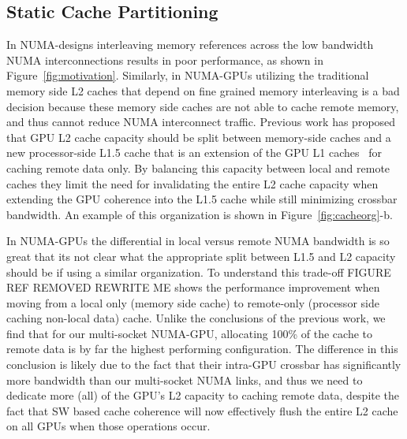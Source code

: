 \subsection{Static Cache Partitioning}
In NUMA-designs interleaving memory references across the low bandwidth NUMA
interconnections results in poor performance, as shown in Figure~\ref{fig:motivation}.
Similarly, in NUMA-GPUs utilizing the traditional memory side L2 caches that 
depend on fine grained memory interleaving is a bad decision because these memory
side caches are not able to cache remote memory, and thus cannot reduce NUMA
interconnect traffic.  Previous work has proposed that GPU L2 cache capacity
should be split between memory-side caches and a new processor-side L1.5 cache
that is an extension of the GPU L1 caches~\cite{Arunkumar2017} for caching remote
data only.  By balancing this capacity between local and remote caches they limit the 
need for invalidating the entire L2 cache capacity when extending the GPU coherence 
into the L1.5 cache while still minimizing crossbar bandwidth. An example of this 
organization is shown in Figure~\ref{fig:cacheorg}-b.

In NUMA-GPUs the differential in local versus remote NUMA bandwidth is so great
that its not clear what the appropriate split between L1.5 and L2 capacity should be
if using a similar organization.  To understand this trade-off FIGURE REF REMOVED REWRITE ME
shows the performance improvement when moving from a local only (memory side cache)
to remote-only (processor side caching non-local data) cache.  Unlike the conclusions
of the previous work, we find that for our multi-socket NUMA-GPU, allocating
100\% of the cache to remote data is by far the highest performing configuration.
The difference in this conclusion is likely due to the fact that their intra-GPU
crossbar has significantly more bandwidth than our multi-socket NUMA links, and thus
we need to dedicate more (all) of the GPU's L2 capacity to caching remote data, despite
the fact that SW based cache coherence will now effectively flush the entire L2 cache
on all GPUs when those operations occur.


